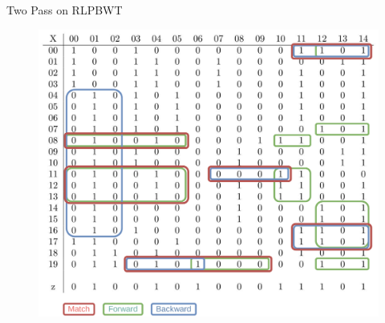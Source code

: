 \documentclass{beamer}
\begin{document}
\begin{frame}{Two Pass on RLPBWT}
{\begin{figure}[H]
      \includegraphics[scale = 0.3]{graph/bitravismatch.pdf}
    \end{figure}
  }
\end{frame}
%   
%   
\end{document}
